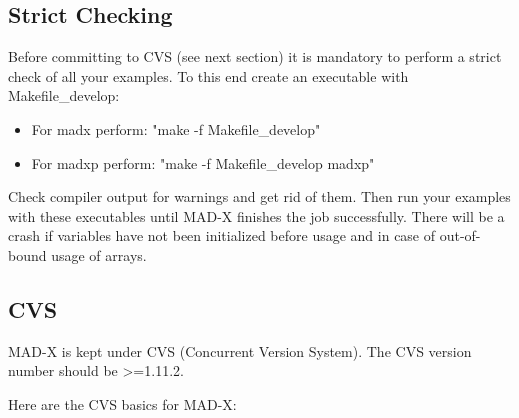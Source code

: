 \subsection{Strict Checking} 
Before committing to CVS (see next section) it is mandatory to perform a
strict check of all your examples. To this end create an executable with
Makefile\_develop:  


\begin{itemize}
 \item  For madx perform: "make -f Makefile\_develop" 
 \item  For madxp perform: "make -f Makefile\_develop madxp" 
\end{itemize} 

Check compiler output for warnings and get rid of them. Then run your
examples with these executables until MAD-X finishes the job
successfully. There will be a crash if variables have not been
initialized before usage and in case of out-of-bound usage of arrays.  



\subsection{CVS} 
MAD-X is kept under CVS (Concurrent Version System). The CVS version number should be \textgreater =1.11.2. 

Here are the  CVS basics for MAD-X: 


